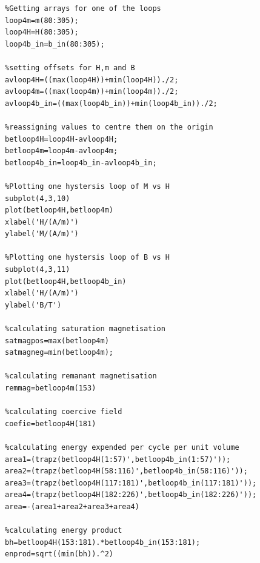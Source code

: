 \documentclass[a4paper]{article}\usepackage[english]{babel}
\begin{document}
\begin{lstlisting}
%Getting arrays for one of the loops
loop4m=m(80:305);
loop4H=H(80:305);
loop4b_in=b_in(80:305);

%setting offsets for H,m and B
avloop4H=((max(loop4H))+min(loop4H))./2;
avloop4m=((max(loop4m))+min(loop4m))./2;
avloop4b_in=((max(loop4b_in))+min(loop4b_in))./2;

%reassigning values to centre them on the origin
betloop4H=loop4H-avloop4H;
betloop4m=loop4m-avloop4m;
betloop4b_in=loop4b_in-avloop4b_in;

%Plotting one hystersis loop of M vs H
subplot(4,3,10)
plot(betloop4H,betloop4m)
xlabel('H/(A/m)')
ylabel('M/(A/m)')

%Plotting one hystersis loop of B vs H
subplot(4,3,11)
plot(betloop4H,betloop4b_in)
xlabel('H/(A/m)')
ylabel('B/T')

%calculating saturation magnetisation
satmagpos=max(betloop4m)
satmagneg=min(betloop4m);

%calculating remanant magnetisation
remmag=betloop4m(153)

%calculating coercive field
coefie=betloop4H(181)

%calculating energy expended per cycle per unit volume
area1=(trapz(betloop4H(1:57)',betloop4b_in(1:57)'));
area2=(trapz(betloop4H(58:116)',betloop4b_in(58:116)'));
area3=(trapz(betloop4H(117:181)',betloop4b_in(117:181)'));
area4=(trapz(betloop4H(182:226)',betloop4b_in(182:226)'));
area=-(area1+area2+area3+area4)

%calculating energy product
bh=betloop4H(153:181).*betloop4b_in(153:181);
enprod=sqrt((min(bh)).^2)
 \end{lstlisting}
\end{document}
